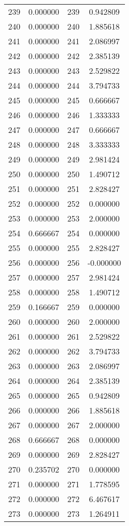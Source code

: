 \documentclass[12pt]{article}
\begin{document}
\begin{longtable}{@{}cccc@{}}
239 & 0.000000 & 239 & 0.942809 \\
240 & 0.000000 & 240 & 1.885618 \\
241 & 0.000000 & 241 & 2.086997 \\
242 & 0.000000 & 242 & 2.385139 \\
243 & 0.000000 & 243 & 2.529822 \\
244 & 0.000000 & 244 & 3.794733 \\
245 & 0.000000 & 245 & 0.666667 \\
246 & 0.000000 & 246 & 1.333333 \\
247 & 0.000000 & 247 & 0.666667 \\
248 & 0.000000 & 248 & 3.333333 \\
249 & 0.000000 & 249 & 2.981424 \\
250 & 0.000000 & 250 & 1.490712 \\
251 & 0.000000 & 251 & 2.828427 \\
252 & 0.000000 & 252 & 0.000000 \\
253 & 0.000000 & 253 & 2.000000 \\
254 & 0.666667 & 254 & 0.000000 \\
255 & 0.000000 & 255 & 2.828427 \\
256 & 0.000000 & 256 & -0.000000 \\
257 & 0.000000 & 257 & 2.981424 \\
258 & 0.000000 & 258 & 1.490712 \\
259 & 0.166667 & 259 & 0.000000 \\
260 & 0.000000 & 260 & 2.000000 \\
261 & 0.000000 & 261 & 2.529822 \\
262 & 0.000000 & 262 & 3.794733 \\
263 & 0.000000 & 263 & 2.086997 \\
264 & 0.000000 & 264 & 2.385139 \\
265 & 0.000000 & 265 & 0.942809 \\
266 & 0.000000 & 266 & 1.885618 \\
267 & 0.000000 & 267 & 2.000000 \\
268 & 0.666667 & 268 & 0.000000 \\
269 & 0.000000 & 269 & 2.828427 \\
270 & 0.235702 & 270 & 0.000000 \\
271 & 0.000000 & 271 & 1.778595 \\
272 & 0.000000 & 272 & 6.467617 \\
273 & 0.000000 & 273 & 1.264911 \\

\end{longtable}
\end{document}
